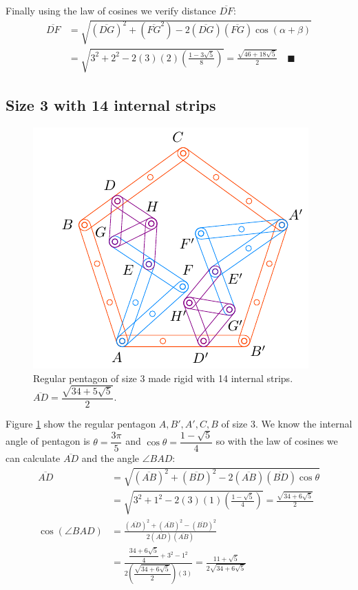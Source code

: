 \documentclass[11pt]{article}
\begin{document}
Finally using the law of cosines we verify distance $\overline{DF}$:
\begin{align}
\overline{DF} &= \sqrt{(\overline{DG})^2 + (\overline{FG}^2)
 - 2(\overline{DG})(\overline{FG})\cos(\alpha+\beta)} \nonumber\\
 &= \sqrt{3^2 + 2^2 - 2(3)(2)\left(\frac{1 - 3\sqrt5}8\right)}
 = \frac{\sqrt{46+18\sqrt5}}2 \quad\blacksquare
\end{align}

\subsection{Size 3 with 14 internal strips}

\begin{figure}[H]
\centering
\includegraphics[scale=1.2]{3/penta3-14a}
\caption{Regular pentagon of size 3 made rigid with 14 internal strips. $\overline{AD} = \dfrac{\sqrt{34+5\sqrt5}}2$.}
\label{fig:penta3-14a}
\end{figure}

Figure \ref{fig:penta3-14a} show the regular pentagon $A,B',A',C,B$ of size $3$. We know the internal angle of pentagon is $\theta=\dfrac{3\pi}5$ and $\cos\theta=\dfrac{1-\sqrt5}4$ so with the law of cosines we can calculate $\overline{AD}$ and the angle $\angle{BAD}$:
\begin{align}
\overline{AD} &= \sqrt{(\overline{AB})^2 + (\overline{BD})^2
 - 2(\overline{AB})(\overline{BD})\cos\theta} \nonumber\\
 &= \sqrt{3^2 + 1^2 - 2(3)(1)\left(\frac{1-\sqrt5}4\right)} = \frac{\sqrt{34+6\sqrt5}}2\\
\cos(\angle{BAD}) &= \frac{(\overline{AD})^2 + (\overline{AB})^2 - (\overline{BD})^2}
 {2(\overline{AD})(\overline{AB})} \nonumber\\
 &= \frac{\dfrac{34+6\sqrt5}4 + 3^2 - 1^2}{2\left(\dfrac{\sqrt{34+6\sqrt5}}2\right)(3)}
  = \frac{11+\sqrt5}{2\sqrt{34+6\sqrt5}}
\end{align}
\end{document}
